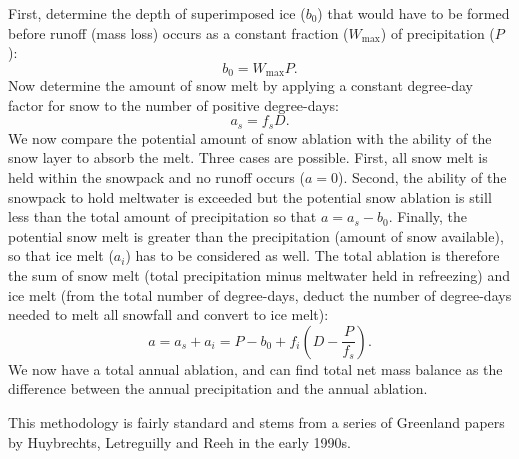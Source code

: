 First, determine the depth of superimposed ice ($b_0$) that would have to
be formed before runoff (mass loss) occurs as a constant fraction
($W_{\textrm{max}}$) of precipitation ($P$):
\begin{equation}
    b_0=W_{\textrm{max}} P.
\end{equation}
Now determine the amount of snow melt by applying a constant
degree-day factor for snow to the number of positive degree-days:
\begin{equation}
    a_s=f_s D.
\end{equation}
We now compare the potential amount of snow ablation with the
ability of the snow layer to absorb the melt.  Three cases are
possible. First, all snow melt is held within the snowpack and no
runoff occurs ($a=0$).  Second, the ability of the snowpack to
hold meltwater is exceeded but the potential snow ablation is
still less than the total amount of precipitation so that
$a=a_s-b_0$. Finally, the potential snow melt is greater than the
precipitation (amount of snow available), so that ice melt ($a_i$)
has to be considered as well.  The total ablation is therefore the
sum of snow melt (total precipitation minus meltwater held in
refreezing) and ice melt (from the total number of degree-days,
deduct the number of degree-days needed to melt all snowfall and convert
to ice melt):
\begin{equation}
    a=a_s + a_i = P - b_0 + f_i \left( D-\frac{P}{f_s} \right).
\end{equation}
We now have a total annual ablation, and can find total net mass
balance as the difference between the annual precipitation
and the annual ablation.

This methodology is fairly standard and stems from a
series of Greenland papers by Huybrechts, Letreguilly and Reeh in
the early 1990s.
%
%
%
